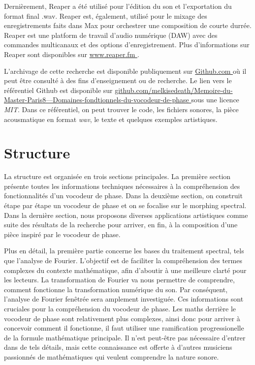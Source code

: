 Dernièrement, Reaper a été utilisé pour l'édition du son et l'exportation du format final \guillemotleft .wav\guillemotright. Reaper est, également, utilisé pour le mixage des enregistrements faits dans Max pour orchestrer une composition de courte durrée. Reaper est une platform de travail d'audio numérique (DAW) avec des commandes multicanaux et des options d'enregistrement. Plus d’informations sur Reaper sont disponibles sur \href{https://www.reaper.fm/}{\guillemotleft www.reaper.fm \guillemotright}.

L'archivage de cette recherche est disponible publiquement sur \href{https://github.com/}{\guillemotleft Github.com \guillemotright} où il peut être consulté à des fins d'enseignement ou de recherche. Le lien vers le référentiel Github est disponible sur \href{https://github.com/melkisedeath/Memoire-du-Master-Paris8---Domaines-fondtionnels-du-vocodeur-de-phase}{\guillemotleft github.com/melkisedeath/Memoire-du-Master-Paris8---Domaines-fondtionnels-du-vocodeur-de-phase \guillemotright} sous une licence \textit{MIT}. Dans ce référentiel, on peut trouver le code, les fichiers sonores, la pièce acousmatique en format \textit{wav}, le texte et quelques exemples artistiques.

\section{Structure}

La structure est organisée en trois sections principales. La première section présente toutes les informations techniques nécessaires à la compréhension des fonctionnalités d'un vocodeur de phase. Dans la deuxième section, on construit étape par étape un vocodeur de phase et on se focalise sur le morphing spectral. Dans la dernière section, nous proposons diverses applications artistiques comme suite des résultats de la recherche pour arriver, en fin, à la composition d'une pièce inspiré par le vocodeur de phase.

Plus en détail, la première partie concerne les bases du traitement spectral, tels que l'analyse de Fourier. L’objectif est de faciliter la compréhension des termes complexes du contexte mathématique, afin d’aboutir à une meilleure clarté pour les lecteurs. La transformation de Fourier va nous permettre de comprendre, comment fonctionne la transformation numérique du son. Par conséquent, l'analyse de Fourier fenêtrée sera amplement investiguée. Ces informations sont cruciales pour la compréhension du vocodeur de phase. Les maths derrière le vocodeur de phase sont relativement plus complexes, ainsi donc pour arriver à concevoir comment il fonctionne, il faut utiliser une ramification progressionelle de la formule mathématique principale. Il n'est peut-être pas nécessaire d'entrer dans de tels détails, mais cette connaissance est offerte à d'autres musiciens passionnés de mathématiques qui veulent comprendre la nature sonore.

